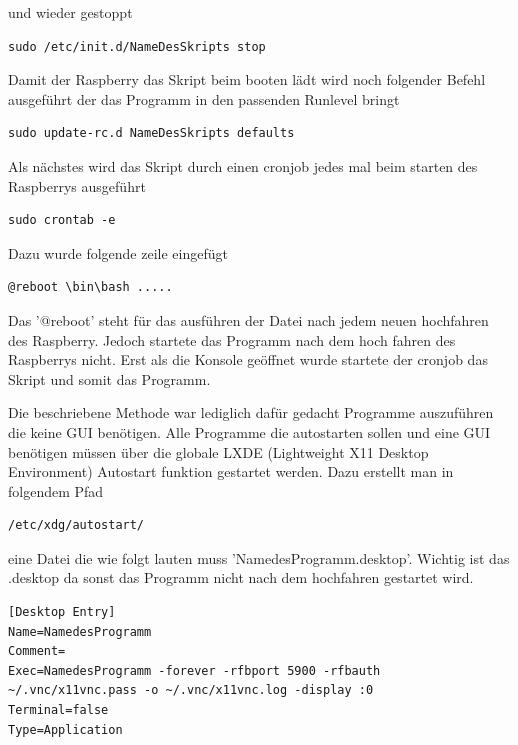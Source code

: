 \documentclass[11pt,a4paper]{article} %
\begin{document}
und wieder gestoppt
\begin{frame}

\begin{lstlisting}
sudo /etc/init.d/NameDesSkripts stop
\end{lstlisting}
\end{frame}

Damit der Raspberry das Skript beim booten l\"adt wird noch folgender Befehl ausgef\"uhrt der das Programm in den passenden Runlevel bringt
\begin{frame}

\begin{lstlisting}
sudo update-rc.d NameDesSkripts defaults
\end{lstlisting}
\end{frame}
\par

Als n\"achstes wird das Skript durch einen cronjob jedes mal beim starten des Raspberrys ausgef\"uhrt

\begin{frame}

\begin{lstlisting}
sudo crontab -e
\end{lstlisting}
\end{frame}
Dazu wurde folgende zeile eingef\"ugt
\begin{frame}

\begin{lstlisting}
@reboot \bin\bash .....
\end{lstlisting}
\end{frame}
Das '@reboot' steht f\"ur das ausf\"uhren der Datei nach jedem neuen hochfahren des Raspberry. Jedoch startete das Programm nach dem hoch fahren des Raspberrys nicht. Erst als die Konsole ge\"offnet wurde startete der cronjob das Skript und somit das Programm.
\par
Die beschriebene Methode war lediglich daf\"ur gedacht Programme auszuf\"uhren die keine GUI ben\"otigen. Alle Programme die autostarten sollen und eine GUI ben\"otigen m\"ussen \"uber die globale LXDE (Lightweight X11 Desktop Environment) Autostart funktion gestartet werden.
Dazu erstellt man in folgendem Pfad
\begin{frame}

\begin{lstlisting}
/etc/xdg/autostart/
\end{lstlisting}
\end{frame}
eine Datei die wie folgt lauten muss 'NamedesProgramm.desktop'. Wichtig ist das .desktop da sonst das Programm nicht nach dem hochfahren gestartet wird.
\begin{frame}

\begin{lstlisting}
[Desktop Entry]
Name=NamedesProgramm
Comment=
Exec=NamedesProgramm -forever -rfbport 5900 -rfbauth ~/.vnc/x11vnc.pass -o ~/.vnc/x11vnc.log -display :0
Terminal=false
Type=Application
\end{lstlisting}
\end{frame}
\end{document}
